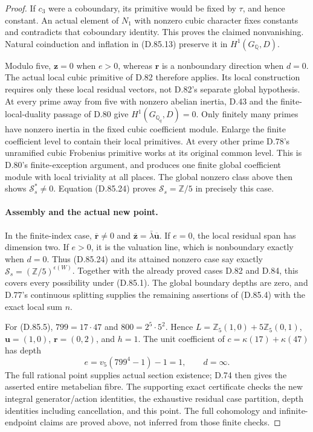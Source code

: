 \begin{proof}
If \(c_3\) were a coboundary, its primitive would be fixed
by \(\tau\), and hence constant. An actual element of
\(N_1\) with nonzero cubic character fixes constants and
contradicts that coboundary identity. This proves the claimed
nonvanishing. Natural coinduction and inflation in (D.85.13)
preserve it in \(H^1(G_{\mathbb Q},D)\).

Modulo five, \(\mathbf z=0\) when \(e>0\), whereas
\(\mathbf r\) is a nonboundary direction when \(d=0\).
The actual local cubic primitive of D.82 therefore applies.
Its local construction requires only these local residual
vectors, not D.82's separate global hypothesis.
At every prime away from five with nonzero abelian inertia,
D.43 and the finite-local-duality passage of D.80 give
\(H^1(G_{\mathbb Q_q},D)=0\). Only finitely many primes
have nonzero inertia in the fixed cubic coefficient module.
Enlarge the finite coefficient level to contain their local
primitives. At every other prime D.78's unramified cubic
Frobenius primitive works at its original common level.
This is D.80's finite-exception argument, and produces one
finite global coefficient module with local triviality at
all places. The global nonzero class above then shows
\(\mathcal S_s^*\ne0\). Equation (D.85.24) proves
\(\mathcal S_s=\mathbb Z/5\) in precisely this case.

\paragraph{Assembly and the actual new point.}
In the finite-index case, \(\overline{\mathbf r}\ne0\)
and \(\overline{\mathbf z}=\bar\lambda\overline{\mathbf u}\).
If \(e=0\), the local residual span has dimension two.
If \(e>0\), it is the valuation line, which is nonboundary
exactly when \(d=0\). Thus (D.85.24) and its attained
nonzero case say exactly \(\mathcal S_s=(\mathbb Z/5)^{\epsilon(W)}\).
Together with the already proved cases D.82 and D.84, this
covers every possibility under (D.85.1). The global boundary
depths are zero, and D.77's continuous splitting supplies
the remaining assertions of (D.85.4) with the exact local
sum \(n\).

For (D.85.5), \(799=17\cdot47\) and
\(800=2^5\cdot5^2\). Hence
\(L=\mathbb Z_5(1,0)+5\mathbb Z_5(0,1)\),
\(\mathbf u=(1,0)\), \(\mathbf r=(0,2)\), and \(h=1\).
The unit coefficient of \(c=\kappa(17)+\kappa(47)\)
has depth
\[
 e=v_5(799^4-1)-1=1,
 \qquad d=\infty.
                                                               \tag{D.85.26}
\]
The full rational point supplies actual section existence;
D.74 then gives the asserted entire metabelian fibre.
The supporting exact certificate
 checks the new integral
generator/action identities, the exhaustive residual case
partition, depth identities including cancellation, and
this point. The full cohomology and infinite-endpoint
claims are proved above, not inferred from those finite checks.
\end{proof}
